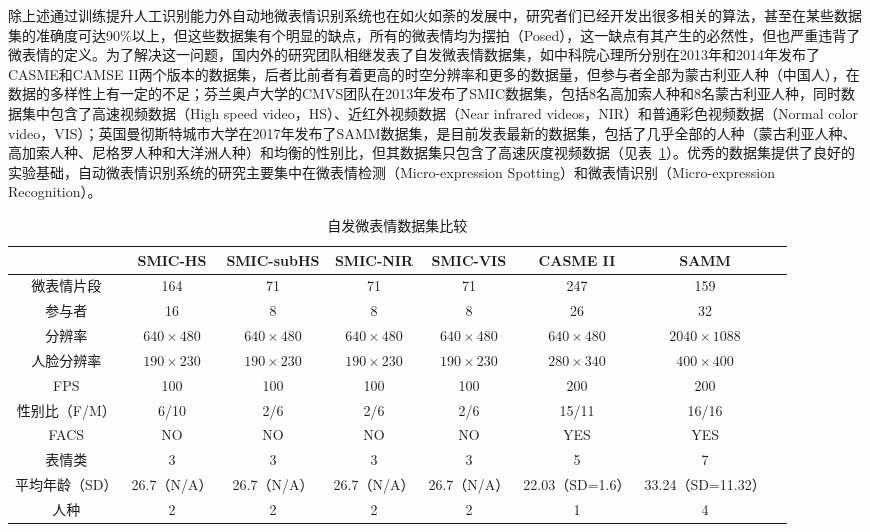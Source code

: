 除上述通过训练提升人工识别能力外自动地微表情识别系统也在如火如荼的发展中，研究者们已经开发出很多相关的算法，甚至在某些数据集的准确度可达90\%以上，但这些数据集有个明显的缺点，所有的微表情均为摆拍（Posed），这一缺点有其产生的必然性，但也严重违背了微表情的定义。为了解决这一问题，国内外的研究团队相继发表了自发微表情数据集，如中科院心理所分别在2013年和2014年发布了CASME\citep{Yan2013CASME}和CAMSE II\citep{Yan2014CASME}两个版本的数据集，后者比前者有着更高的时空分辨率和更多的数据量，但参与者全部为蒙古利亚人种（中国人），在数据的多样性上有一定的不足；芬兰奥卢大学的CMVS团队在2013年发布了SMIC数据集\citep{Li2013A}，包括8名高加索人种和8名蒙古利亚人种，同时数据集中包含了高速视频数据（High speed video，HS）、近红外视频数据（Near infrared videos，NIR）和普通彩色视频数据（Normal color video，VIS）；英国曼彻斯特城市大学在2017年发布了SAMM数据集\citep{Davison2018SAMM}，是目前发表最新的数据集，包括了几乎全部的人种（蒙古利亚人种、高加索人种、尼格罗人种和大洋洲人种）和均衡的性别比，但其数据集只包含了高速灰度视频数据（见表~\ref{tab1}）。优秀的数据集提供了良好的实验基础，自动微表情识别系统的研究主要集中在微表情检测（Micro-expression Spotting）和微表情识别（Micro-expression Recognition）。

\begin{table}[!htbp]
   \caption{自发微表情数据集比较}
   \label{tab1}
   \centering
   \footnotesize%
   \setlength{\tabcolsep}{4pt}%
   \renewcommand{\arraystretch}{1.2}%
   \begin{tabular}{c|ccccccc}
     \toprule[0.7pt]
        & SMIC-HS &  SMIC-subHS &  SMIC-NIR &  SMIC-VIS &  CASME II &  SAMM \\ \hline
微表情片段    & 164       & 71         & 71       & 71       & 247           & 159             \\
参与者      & 16        & 8          & 8        & 8        & 26            & 32              \\
分辨率      & $640\times480$   & $640\times480$    & $640\times480$  & $640\times480$  & $640\times480$       & $2040\times1088$      \\
人脸分辨率    & $190\times230$   & $190\times230$    & $190\times230$  & $190\times230$  & $280\times340$       & $400\times400$         \\
FPS      & 100       & 100        & 100      & 100      & 200           & 200             \\
性别比（F/M） & 6/10      &  2/6          &  2/6        &  2/6        & 15/11         & 16/16           \\
FACS     & NO        & NO         & NO       & NO       & YES           & YES             \\
表情类      & 3         & 3          & 3        & 3        & 5             & 7               \\
平均年龄（SD） & 26.7（N/A） &   26.7（N/A） &  26.7（N/A） & 26.7（N/A）  & 22.03（SD=1.6） & 33.24（SD=11.32） \\
人种       & 2         & 2           &  2        & 2         & 1             & 4               \\
\bottomrule[0.7pt]
   \end{tabular}
\end{table}

